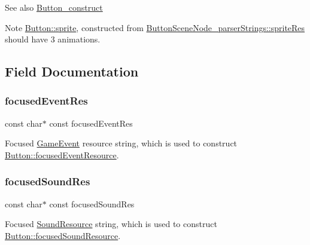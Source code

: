 \begin{DoxySeeAlso}{See also}
\hyperlink{_button_8c_af75cacaf53085bfb94b9c70c6b10caed}{Button\+\_\+construct} 
\end{DoxySeeAlso}
\begin{DoxyNote}{Note}
\hyperlink{struct_button_a1128327f94baacb1570a98fca0591108}{Button\+::sprite}, constructed from \hyperlink{struct_button_scene_node__parser_strings_a008090dd7a5af169656ea5a85a437385}{Button\+Scene\+Node\+\_\+parser\+Strings\+::sprite\+Res} should have 3 animations. 
\end{DoxyNote}


\subsection{Field Documentation}
\hypertarget{struct_button_scene_node__parser_strings_aab416a914f7b3b4514bd5cf98c4558a8}{}\label{struct_button_scene_node__parser_strings_aab416a914f7b3b4514bd5cf98c4558a8} 
\subsubsection{\texorpdfstring{focused\+Event\+Res}{focusedEventRes}}
{\footnotesize\ttfamily const char$\ast$ const focused\+Event\+Res}

Focused \hyperlink{struct_game_event}{Game\+Event} resource string, which is used to construct \hyperlink{struct_button_aff7dcf845e86b8d62077ceec6094f3e3}{Button\+::focused\+Event\+Resource}. \hypertarget{struct_button_scene_node__parser_strings_a657d14ed5cdb24ab74adbd963640824b}{}\label{struct_button_scene_node__parser_strings_a657d14ed5cdb24ab74adbd963640824b} 
\subsubsection{\texorpdfstring{focused\+Sound\+Res}{focusedSoundRes}}
{\footnotesize\ttfamily const char$\ast$ const focused\+Sound\+Res}

Focused \hyperlink{struct_sound_resource}{Sound\+Resource} string, which is used to construct \hyperlink{struct_button_a8848ee5b886f588a966fc6c3ff0270df}{Button\+::focused\+Sound\+Resource}. \hypertarget{struct_button_scene_node__parser_strings_ae4be9330e3ecb371dd29fe7c0851c565}{}\label{struct_button_scene_node__parser_strings_ae4be9330e3ecb371dd29fe7c0851c565} 
